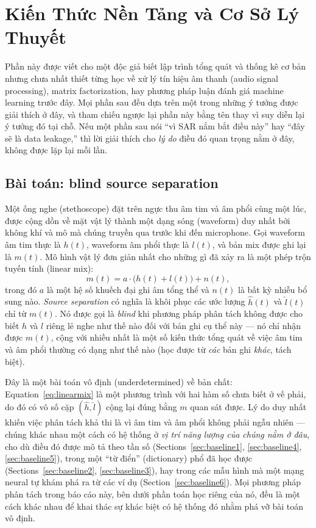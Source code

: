 \documentclass[11pt]{article}
\begin{document}
\section{Kiến Thức Nền Tảng và Cơ Sở Lý Thuyết}
\label{sec:background}

Phần này được viết cho một độc giả biết lập trình tổng quát và thống kê cơ
bản nhưng chưa nhất thiết từng học về xử lý tín hiệu âm thanh (audio
signal processing), matrix factorization, hay phương pháp luận đánh giá
machine learning trước đây. Mọi phần sau đều dựa trên một trong những ý
tưởng được giải thích ở đây, và tham chiếu ngược lại phần này bằng tên
thay vì suy diễn lại ý tưởng đó tại chỗ. Nếu một phần sau nói ``vì SAR nắm
bắt điều này'' hay ``đây sẽ là data leakage,'' thì lời giải thích cho
\emph{lý do} điều đó quan trọng nằm ở đây, không được lặp lại mỗi lần.

\subsection{Bài toán: blind source separation}
\label{sec:bg-bss}

Một ống nghe (stethoscope) đặt trên ngực thu âm tim và âm phổi cùng một
lúc, được cộng dồn về mặt vật lý thành một dạng sóng (waveform) duy nhất
bởi không khí và mô mà chúng truyền qua trước khi đến microphone. Gọi
waveform âm tim thực là $h(t)$, waveform âm phổi thực là $l(t)$, và bản
mix được ghi lại là $m(t)$. Mô hình vật lý đơn giản nhất cho những gì đã
xảy ra là một phép trộn tuyến tính (linear mix):
\begin{equation}
m(t) = a\cdot\bigl(h(t) + l(t)\bigr) + n(t),
\label{eq:linearmix}
\end{equation}
trong đó $a$ là một hệ số khuếch đại ghi âm tổng thể và $n(t)$ là bất kỳ
nhiễu bổ sung nào. \emph{Source separation} có nghĩa là khôi phục các ước
lượng $\hat h(t)$ và $\hat l(t)$ chỉ từ $m(t)$. Nó được gọi là \emph{blind}
khi phương pháp phân tách không được cho biết $h$ và $l$ riêng lẻ nghe như
thế nào đối với bản ghi cụ thể này --- nó chỉ nhận được $m(t)$, cộng với
nhiều nhất là một số kiến thức tổng quát về việc âm tim và âm phổi thường
có dạng như thế nào (học được từ \emph{các} bản ghi \emph{khác}, tách
biệt).

Đây là một bài toán vô định (underdetermined) về bản chất:
Equation~\ref{eq:linearmix} là một phương trình với hai hàm số chưa biết ở
vế phải, do đó có vô số cặp $(\hat h, \hat l)$ cộng lại đúng bằng $m$ quan
sát được. Lý do duy nhất khiến việc phân tách khả thi là vì âm tim và âm
phổi không phải ngẫu nhiên --- chúng khác nhau một cách có hệ thống ở
\emph{vị trí năng lượng của chúng nằm ở đâu}, cho dù điều đó được mô tả
theo tần số (Sections~\ref{sec:baseline1}, \ref{sec:baseline4},
\ref{sec:baseline5}), trong một ``từ điển'' (dictionary) phổ đã học được
(Sections~\ref{sec:baseline2}, \ref{sec:baseline3}), hay trong các mẫu
hình mà một mạng neural tự khám phá ra từ các ví dụ
(Section~\ref{sec:baseline6}). Mọi phương pháp phân tách trong báo cáo này,
bên dưới phần toán học riêng của nó, đều là một cách khác nhau để khai
thác sự khác biệt có hệ thống đó nhằm phá vỡ bài toán vô định.
\end{document}
